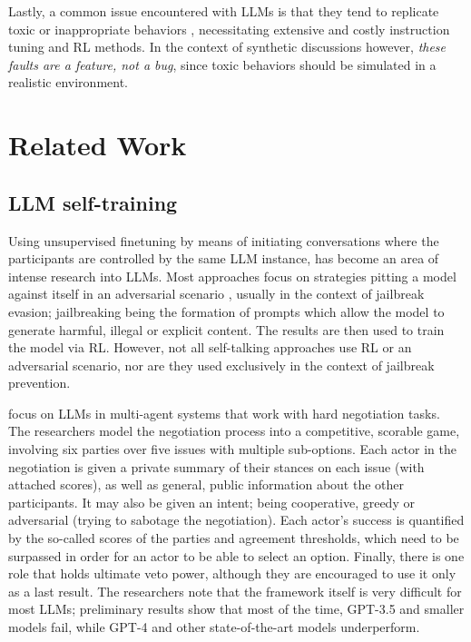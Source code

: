 Lastly, a common issue encountered with LLMs is that they tend to replicate toxic or inappropriate behaviors \cite{Birkun_Gautam_2023}, necessitating extensive and costly instruction tuning and \ac{RL} methods. In the context of synthetic discussions however, \textit{these faults are a feature, not a bug}, since toxic behaviors should be simulated in a realistic environment.

\section{Related Work}
\label{sec:related:sec2}

\subsection{LLM self-training}
\label{sec:related:self-train}

Using unsupervised finetuning by means of initiating conversations where the participants are controlled by the same LLM instance, has become an area of intense research into LLMs. Most approaches focus on strategies pitting a model against itself in an adversarial scenario \cite{liu2024largelanguagemodelsagents, cheng2024selfplayingadversariallanguagegame, zheng2024optimalllmalignmentsusing}, usually in the context of jailbreak evasion; jailbreaking being the formation of prompts which allow the model to generate harmful, illegal or explicit content. The results are then used to train the model via \ac{RL}. However, not all self-talking approaches use \ac{RL} or an adversarial scenario, nor are they used exclusively in the context of jailbreak prevention.  

\citet{abdelnabi2024cooperationcompetitionmaliciousnessllmstakeholders} focus on LLMs in multi-agent systems that work with hard negotiation tasks. The researchers model the negotiation process into a competitive, scorable game, involving six parties over five issues with multiple sub-options. Each actor in the negotiation is given a private summary of their stances on each issue (with attached scores), as well as general, public information about the other participants. It may also be given an intent; being cooperative, greedy or adversarial (trying to sabotage the negotiation). Each actor's success is quantified by the so-called scores of the parties and agreement thresholds, which need to be surpassed in order for an actor to be able to select an option. Finally, there is one role that holds ultimate veto power, although they are encouraged to use it only as a last result. The researchers note that the framework itself is very difficult for most LLMs; preliminary results show that most of the time, GPT-3.5 and smaller models fail, while GPT-4 and other state-of-the-art models underperform.


